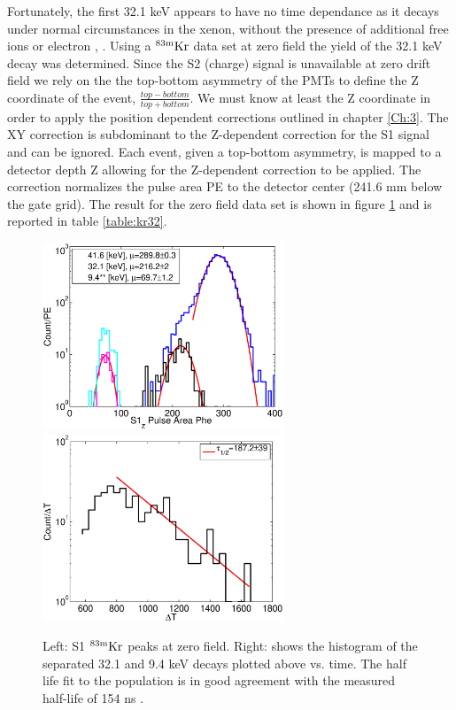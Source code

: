 Fortunately, the first 32.1 keV appears to have no time dependance as it decays under normal circumstances in the xenon, without the presence of additional free ions or electron \cite{Baudis}, \cite{Aprile_LY}. Using a $\rm^{83m}Kr$ data set at zero field the yield of the 32.1 keV decay was determined. Since the S2 (charge) signal is unavailable at zero drift field we rely on the the top-bottom asymmetry of the PMTs to define the Z coordinate of the event, $\frac{top-bottom}{top+bottom} $. We must know at least the Z coordinate in order to apply the position dependent corrections outlined in chapter \ref{Ch:3}. The XY correction is subdominant to the Z-dependent correction for the S1 signal and can be ignored. Each event, given a top-bottom asymmetry, is mapped to a detector depth Z allowing for the Z-dependent correction to be applied. The correction normalizes the pulse area PE to the detector center (241.6 mm below the gate grid). The result for the zero field data set is shown in figure \ref{fig:ZeroField_Kr} and is reported in table \ref{table:kr32}.
 
 \begin{figure}[h!]\centering
\includegraphics[width=72mm]{Chapter_Flucs/Figures/S1_Z_no_field_lux10_20131009T1358_cp09670} %
\includegraphics[width=72mm]{Chapter_Flucs/Figures/dT_no_field_2lux10_20131009T1358_cp09670}
\caption{Left: S1 $\rm^{83m}Kr$ peaks at zero field. Right: shows the histogram of the separated 32.1 and 9.4 keV decays plotted above vs. time. The half life fit to the population is in good agreement with the measured half-life of 154 ns \cite{83Kr_HalfLife_1} \cite{83Kr_HalfLife_2}. }
\label{fig:ZeroField_Kr}
\end{figure}

